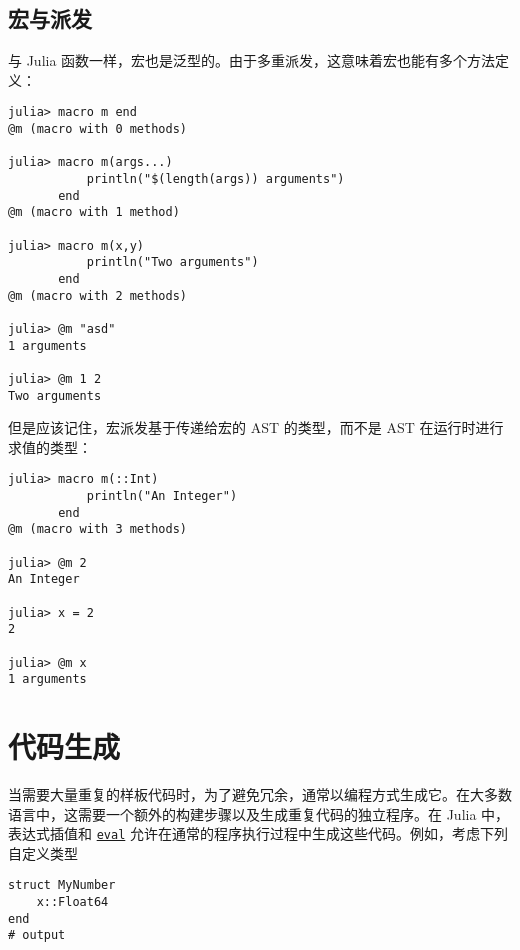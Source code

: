 \hypertarget{11371303288264026631}{}


\subsection{宏与派发}



与 Julia 函数一样，宏也是泛型的。由于多重派发，这意味着宏也能有多个方法定义：




\begin{verbatim}
julia> macro m end
@m (macro with 0 methods)

julia> macro m(args...)
           println("$(length(args)) arguments")
       end
@m (macro with 1 method)

julia> macro m(x,y)
           println("Two arguments")
       end
@m (macro with 2 methods)

julia> @m "asd"
1 arguments

julia> @m 1 2
Two arguments
\end{verbatim}



但是应该记住，宏派发基于传递给宏的 AST 的类型，而不是 AST 在运行时进行求值的类型：




\begin{verbatim}
julia> macro m(::Int)
           println("An Integer")
       end
@m (macro with 3 methods)

julia> @m 2
An Integer

julia> x = 2
2

julia> @m x
1 arguments
\end{verbatim}



\hypertarget{4927517878935278303}{}


\section{代码生成}



当需要大量重复的样板代码时，为了避免冗余，通常以编程方式生成它。在大多数语言中，这需要一个额外的构建步骤以及生成重复代码的独立程序。在 Julia 中，表达式插值和 \hyperlink{7507639810592563424}{\texttt{eval}} 允许在通常的程序执行过程中生成这些代码。例如，考虑下列自定义类型




\begin{verbatim}
struct MyNumber
    x::Float64
end
# output

\end{verbatim}



